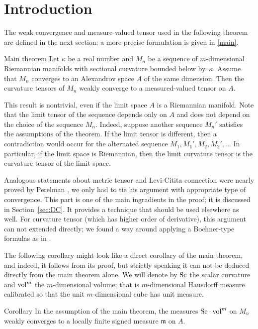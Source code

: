 \section{Introduction}

The weak convergence and measure-valued tensor used in the following theorem are defined in the next section;
a more precise formulation is given in \ref{main}.

\begin{thm}{Main theorem}
Let $\kappa$ be a real number and 
$M_n$ be a sequence of $m$-dimensional Riemannian manifolds with sectional curvature bounded below by~$\kappa$.
Assume that $M_n$ converges to an Alexandrov space $A$ of the same dimension.
Then the curvature tensors of $M_n$ weakly converge to a measured-valued tensor on $A$.
\end{thm}

This result is nontrivial, even if the limit space $A$ is a Riemannian manifold.
Note that the limit tensor of the sequence depends only on $A$ and does not depend on the choice of the sequence $M_n$.
Indeed, suppose another sequence $M_n'$ satisfies the assumptions of the theorem.
If the limit tensor is different, 
then a contradiction would occur for the alternated sequence $M_1,M_1',M_2,M_2',\dots$ 
In particular, if the limit space is Riemannian, then the limit curvature tensor is the curvature tensor of the limit space.

Analogous statements about metric tensor and Levi-Citita connection were nearly proved by Perelman \cite{PerDC},
we only had to tie his argument with appropriate type of convergence.
This part is one of the main ingradients in the proof;
it is discussed in Section~\ref{sec:DC}. 
It provides a technique that should be used elsewhere as well.
For curvature tensor (which has higher order of derivative), this argument can not extended directly;
we found a way around applying a Bochner-type formulas as in \cite{petrunin-SC}.

The following corollary might look like a direct corollary of the main theorem, 
and indeed, it follows from its proof, but strictly speaking it can not be deduced directly from the main theorem alone.
We will denote by $\operatorname{\rm Sc}$ the scalar curvature and $\operatorname{vol}^m$ the $m$-dimensional volume; that is $m$-dimensional Hausdorff measure calibrated so that the unit $m$-dimensional cube has unit measure.

\begin{thm}{Corollary}\label{cor:Sc}
In the assumption of the main theorem,
the measures $\Sc\cdot \vol^m$ on $M_n$ weakly converges to a locally finite signed measure $\mathfrak m$  on $A$.
\end{thm}

